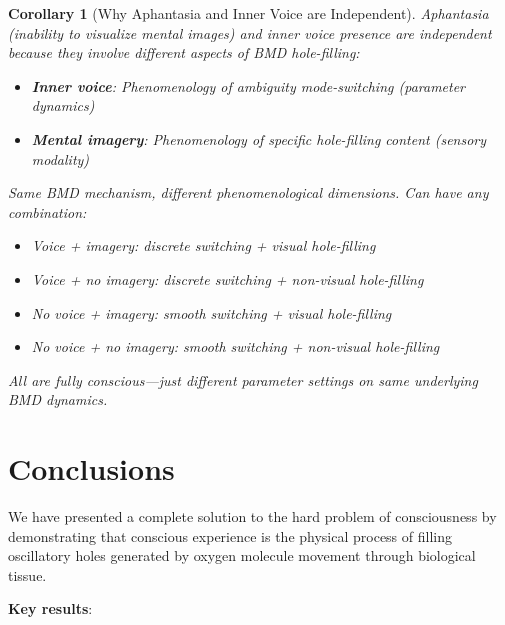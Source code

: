 \documentclass[11pt,a4paper]{article}
\newtheorem{corollary}[theorem]{Corollary}
\begin{document}
\begin{corollary}[Why Aphantasia and Inner Voice are Independent]
\label{cor:aphantasia_independence}
Aphantasia (inability to visualize mental images) and inner voice presence are independent because they involve different aspects of BMD hole-filling:
\begin{itemize}
\item \textbf{Inner voice}: Phenomenology of ambiguity mode-switching (parameter dynamics)
\item \textbf{Mental imagery}: Phenomenology of specific hole-filling content (sensory modality)
\end{itemize}

Same BMD mechanism, different phenomenological dimensions. Can have any combination:
\begin{itemize}
\item Voice + imagery: discrete switching + visual hole-filling
\item Voice + no imagery: discrete switching + non-visual hole-filling
\item No voice + imagery: smooth switching + visual hole-filling
\item No voice + no imagery: smooth switching + non-visual hole-filling
\end{itemize}

All are fully conscious—just different parameter settings on same underlying BMD dynamics.
\end{corollary}

\section{Conclusions}

We have presented a complete solution to the hard problem of consciousness by demonstrating that conscious experience is the physical process of filling oscillatory holes generated by oxygen molecule movement through biological tissue.

\textbf{Key results}:
\end{document}
